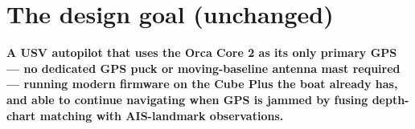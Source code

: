 \documentclass[10pt,a4paper]{article}
\begin{document}
\section{The design goal (unchanged)}
\begin{tcolorbox}[colframe=mCyan, colback=white, title=\normalsize The Vanguard claim — once first deploy is proven]
\textbf{A USV autopilot that uses the Orca Core 2 as its only primary GPS —
no dedicated GPS puck or moving-baseline antenna mast required —
running modern firmware on the Cube Plus the boat already has, and able
to continue navigating when GPS is jammed by fusing depth-chart
matching with AIS-landmark observations.}
\end{tcolorbox}

\pagebreak

\end{document}

